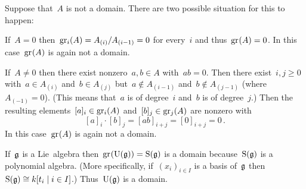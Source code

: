 \section{}

Suppose that~$A$ is not a domain.
There are two possible situation for this to happen:

If~$A = 0$ then~$\gr[i](A) = A_{(i)} / A_{(i-1)} = 0$ for every~$i$ and thus~$\gr(A) = 0$.
In this case~$\gr(A)$ is again not a domain.

If~$A \neq 0$ then there exist nonzero~$a, b \in A$ with~$ab = 0$.
Then there exist~$i, j \geq 0$ with~$a \in A_{(i)}$ and~$b \in A_{(j)}$ but~$a \notin A_{(i-1)}$ and~$b \notin A_{(j-1)}$ (where~$A_{(-1)} = 0$).
(This means that~$a$ is of degree~$i$ and~$b$ is of degree~$j$.)
Then the resulting elements~$[a]_i \in \gr[i](A)$ and~$[b]_j \in \gr[j](A)$ are nonzero with
\[
  [a]_i \cdot [b]_j
  =
  [ab]_{i+j}
  =
  [0]_{i+j}
  =
  0 \,.
\]
In this case~$\gr(A)$ is again not a domain.

If~$\mathfrak{g}$ is a Lie~algebra then~$\gr(\Univ(\glie)) = \Symm(\glie)$ is a domain because~$\operatorname{S}(\mathfrak{g})$ is a polynomial algebra.
(More specifically, if~$(x_i)_{i \in I}$ is a basis of~$\mathfrak{g}$ then~$\Symm(\glie) \cong k[t_i \suchthat i \in I]$.)
Thus~$\operatorname{U}(\mathfrak{g})$ is a domain.




